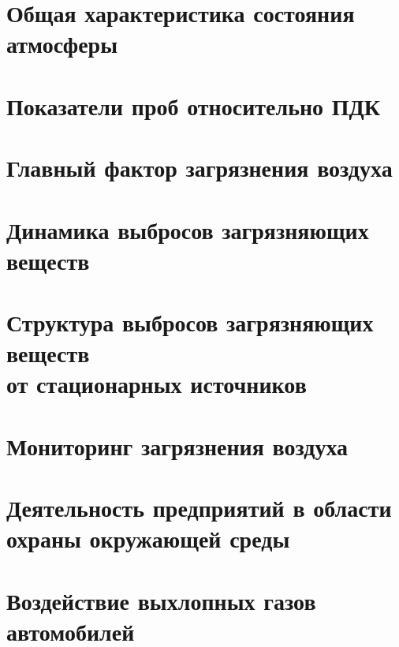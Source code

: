 

\section{Общая характеристика состояния атмосферы}
\begin{frame}{\insertsectionhead}
\end{frame}

\section{Показатели проб относительно ПДК}
\begin{frame}{\insertsectionhead}
\end{frame}

\section{Главный фактор загрязнения воздуха}
\begin{frame}{\insertsectionhead}
\end{frame}

\section{Динамика выбросов загрязняющих веществ}
\begin{frame}{\insertsectionhead}
\end{frame}

\section{Структура выбросов загрязняющих веществ \\ от
стационарных источников}
\begin{frame}{\insertsectionhead}
\end{frame}

\section{Мониторинг загрязнения воздуха}
\begin{frame}{\insertsectionhead}
\end{frame}

\section{Деятельность предприятий в области \\ охраны окружающей среды}
\begin{frame}{\insertsectionhead}
\end{frame}

\section{Воздействие выхлопных газов автомобилей}
\begin{frame}{\insertsectionhead}
\end{frame}




